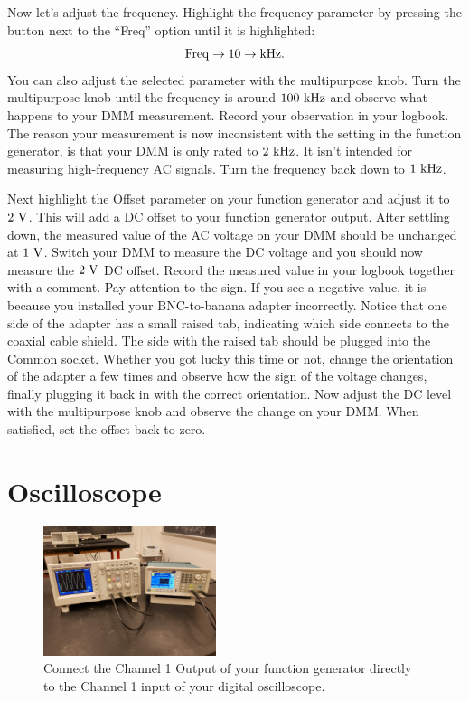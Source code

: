 \begin{measurement} Now let's adjust the frequency. Highlight the frequency parameter by pressing the button next to the ``Freq'' option until it is highlighted:
\begin{displaymath}
\rm Freq \to 10 \to kHz.
\end{displaymath}
You can also adjust the selected parameter with the multipurpose knob.
Turn the multipurpose knob until the frequency is around $100~\rm kHz$
and observe what happens to your DMM measurement.  Record your observation in your logbook. The reason your measurement is now inconsistent with the setting in the function generator, is that your DMM is only rated to $2~\rm kHz$.  It isn't intended for measuring
high-frequency AC signals.  Turn the frequency back down to $1~\rm kHz$. \end{measurement}

\begin{measurement} Next highlight the Offset parameter on your function generator and
adjust it to $2~\rm V$.  This will add a DC offset to your function
generator output.  After settling down, the measured value of the AC
voltage on your DMM should be unchanged at $1~\rm V$.  Switch your DMM
to measure the DC voltage and you should now measure the $2~\rm V$ DC
offset. Record the measured value in your logbook together with a comment.  Pay attention to the sign.  If you see a negative value, it
is because you installed your BNC-to-banana adapter incorrectly. 
Notice that one side of the adapter has a small raised tab, indicating
which side connects to the coaxial cable shield.  The side with the
raised tab should be plugged into the Common socket.  Whether you got
lucky this time or not, change the orientation of the adapter a few
times and observe how the sign of the voltage changes, finally
plugging it back in with the correct orientation. Now adjust the DC
level with the multipurpose knob and observe the change on your DMM.
When satisfied, set the offset back to zero. \end{measurement}

\section{Oscilloscope}

\begin{figure}[htbp]
\begin{center}
\includegraphics[width=0.45\textwidth]{figs/labs/lissajous/scope_setup.jpg} 
\caption{Connect the Channel 1 Output of your function generator directly to the Channel 1 input of your digital oscilloscope.}
\label{fig:scope_setup}
\end{center}
\end{figure}

